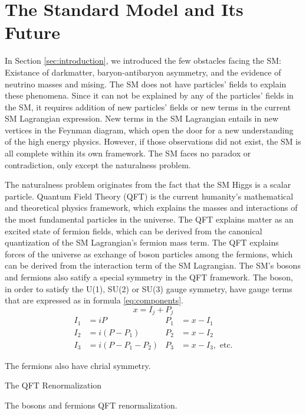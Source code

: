 \chapter{The Standard Model and Its Future}\label{sec:theory}

In Section \ref{sec:introduction}, we introduced the few obstacles facing the SM: Existance of darkmatter, baryon-antibaryon asymmetry, and the evidence of neutrino masses and mising. 
The SM does not have particles' fields to explain these phenomena.
Since it can not be explained by any of the particles' fields in the SM, it requires addition of new particles' fields or new terms in the current SM Lagrangian expression.
New terms in the SM Lagrangian entails in new vertices in the Feynman diagram, which open the door for a new understanding of the high energy physics.
However, if those observations did not exist, the SM is all complete within its own framework.
The SM faces no paradox or contradiction, only except the naturalness problem.

The naturalness problem originates from the fact that the SM Higgs is a scalar particle.
Quantum Field Theory (QFT) is the current humanity's  mathematical and theoretical physics framework, which explains the masses and interactions of the most fundamental particles in the universe.
The QFT explains matter as an excited state of fermion fields, which can be derived from the canonical quantization of the SM Lagrangian's fermion mass term.
The QFT explains forces of the universe as exchange of boson particles among the fermions, which can be derived from the interaction term of the SM Lagrangian.
The SM's bosons and fermions also satify a special symmetry in the QFT framework.
The boson, in order to satisfy the U(1), SU(2) or SU(3) gauge symmetry, have gauge terms that are expressed as in formula \ref{eq:components}.
\begin{equation}
\label{eq:components}
x=I_j + P_j
\end{equation}
\begin{align*}
I_1 &= iP               & P_1 &= x - I_1 \\
I_2 &= i(P - P_1)       & P_2 &= x - I_2 \\
I_3 &= i(P - P_1 - P_2) & P_3 &= x - I_3,\mbox{ etc.}
\end{align*}

The fermions also have chrial symmetry.

The QFT Renormalization

The bosons and fermions QFT renormalization.









